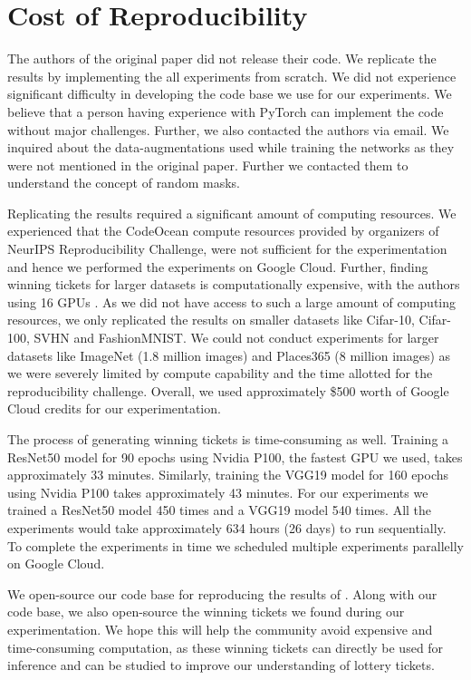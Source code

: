 \documentclass{article}
\begin{document}
\section{Cost of Reproducibility}
\label{sec:cost}
The authors of the original paper \cite{repro_paper} did not release their code. We replicate the results by implementing the all experiments from scratch. We did not experience significant difficulty in developing the code base we use for our experiments. We believe that a person having experience with PyTorch  can implement the code without major challenges. Further, we also contacted the authors via email. We inquired about the data-augmentations used while training the networks as they were not mentioned in the original paper. Further we contacted them to understand the concept of random masks. 

Replicating the results required a significant amount of computing resources. We experienced that the CodeOcean compute resources provided by organizers of NeurIPS Reproducibility Challenge,  were not sufficient for the experimentation and hence we performed the experiments on Google Cloud. Further, finding winning tickets for larger datasets is computationally expensive, with the authors using 16 GPUs \cite{repro_paper}. As we did not have access to such a large amount of computing resources, we only replicated the results on smaller datasets like Cifar-10, Cifar-100, SVHN and FashionMNIST. We could not conduct experiments for larger datasets like ImageNet (1.8 million images) \cite{imagenet} and Places365 (8 million images) \cite{places365} as we were severely limited by compute capability and the time allotted for the reproducibility challenge. Overall, we used  approximately \$500 worth of Google Cloud credits for our experimentation.

The process of generating winning tickets is time-consuming as well. Training a ResNet50 model for 90 epochs using Nvidia P100, the fastest GPU we used, takes approximately 33 minutes. Similarly, training the VGG19 model for 160 epochs using Nvidia P100 takes approximately 43 minutes. For our experiments we trained a ResNet50 model 450 times and a VGG19 model 540 times. All the experiments would take approximately 634 hours (26 days) to run sequentially. To complete the experiments in time we scheduled multiple experiments parallelly on Google Cloud.  

We open-source our code base for reproducing the results of \cite{repro_paper}. Along with our code base, we also open-source the winning tickets we found during our experimentation. We hope this will help the community avoid expensive and time-consuming computation, as these winning tickets can directly be used for inference and can be studied to improve our understanding of lottery tickets. 
\end{document}
